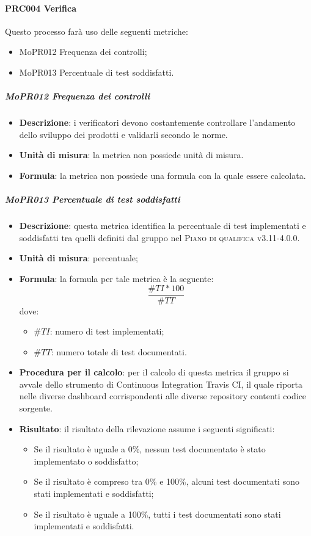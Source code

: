 \documentclass[../norme-di-progetto.tex]{subfiles}
\begin{document}
\paragraph{PRC004 Verifica}
Questo processo farà uso delle seguenti metriche:
\begin{itemize}
  \item MoPR012 Frequenza dei controlli;
  \item MoPR013 Percentuale di test soddisfatti.
\end{itemize}
\subparagraph{MoPR012 Frequenza dei controlli}
\begin{itemize}
  \item \textbf{Descrizione}: i verificatori devono costantemente controllare l'andamento dello sviluppo dei prodotti e validarli secondo le norme.
  \item \textbf{Unità di misura}: la metrica non possiede unità di misura.
  \item \textbf{Formula}: la metrica non possiede una formula con la quale essere calcolata.
\end{itemize}

\subparagraph{MoPR013 Percentuale di test soddisfatti}
\begin{itemize}
  \item \textbf{Descrizione}: questa metrica identifica la percentuale di test implementati e soddisfatti tra quelli definiti dal gruppo nel \textsc{Piano di qualifica v3.11-4.0.0}.
  \item \textbf{Unità di misura}: percentuale;
  \item \textbf{Formula}: la formula per tale metrica è la seguente:
  \begin{displaymath}
    \frac{\#TI * 100}{\#TT}
  \end{displaymath}
  dove:
  \begin{itemize}
    \item $ \#TI $: numero di test implementati;
    \item $ \#TT $: numero totale di test documentati.
  \end{itemize}
  \item \textbf{Procedura per il calcolo}: per il calcolo di questa metrica il gruppo si avvale dello strumento di Continuous Integration Travis CI, il quale riporta nelle diverse dashboard corrispondenti alle diverse repository contenti codice sorgente.
  \item \textbf{Risultato}: il risultato della rilevazione assume i seguenti significati:
  \begin{itemize}
    \item Se il risultato è uguale a 0\%, nessun test documentato è stato implementato o soddisfatto;
    \item Se il risultato è compreso tra 0\% e 100\%, alcuni test documentati sono stati implementati e soddisfatti;
    \item Se il risultato è uguale a 100\%, tutti i test documentati sono stati implementati e soddisfatti.
  \end{itemize}
\end{itemize}
\end{document}
